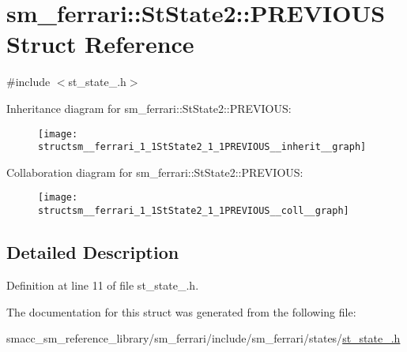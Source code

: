 \hypertarget{structsm__ferrari_1_1StState2_1_1PREVIOUS}{}\section{sm\+\_\+ferrari\+:\+:St\+State2\+:\+:P\+R\+E\+V\+I\+O\+US Struct Reference}
\label{structsm__ferrari_1_1StState2_1_1PREVIOUS}


{\ttfamily \#include $<$st\+\_\+state\+\_.\+h$>$}



Inheritance diagram for sm\+\_\+ferrari\+:\+:St\+State2\+:\+:P\+R\+E\+V\+I\+O\+US\+:
\nopagebreak
\begin{figure}[H]
\begin{center}
\leavevmode
\texttt{[image: structsm\_\_ferrari\_1\_1StState2\_1\_1PREVIOUS\_\_inherit\_\_graph]}
\end{center}
\end{figure}


Collaboration diagram for sm\+\_\+ferrari\+:\+:St\+State2\+:\+:P\+R\+E\+V\+I\+O\+US\+:
\nopagebreak
\begin{figure}[H]
\begin{center}
\leavevmode
\texttt{[image: structsm\_\_ferrari\_1\_1StState2\_1\_1PREVIOUS\_\_coll\_\_graph]}
\end{center}
\end{figure}


\subsection{Detailed Description}


Definition at line 11 of file st\+\_\+state\+\_.\+h.



The documentation for this struct was generated from the following file\+:\begin{DoxyCompactItemize}
\item 
smacc\+\_\+sm\+\_\+reference\+\_\+library/sm\+\_\+ferrari/include/sm\+\_\+ferrari/states/\hyperlink{sm__ferrari_2include_2sm__ferrari_2states_2st__state__2_8h}{st\+\_\+state\+\_.\+h}\end{DoxyCompactItemize}
